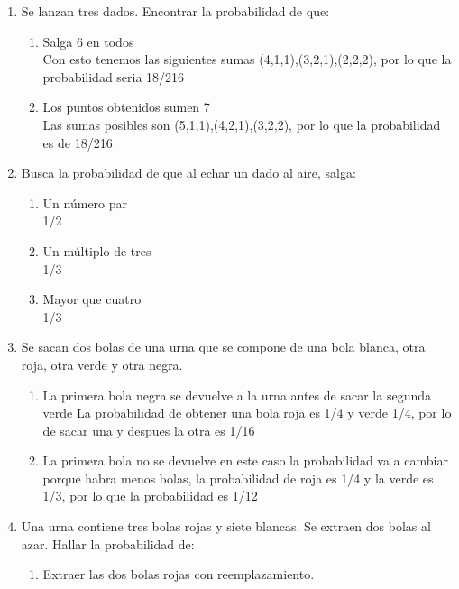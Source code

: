 \documentclass[12pt,letterpaper]{report}
\begin{document}
\begin{enumerate}
\begin{enumerate}
    En este caso nos piden que sea, 3,6,9,12, por lo que los posibles numeros son (2,1),(1,2),(4,2),(2,4),(5,1),(1,5),(3,3),(6,3),(3,6),(5,4),(4,5),(6,6), por lo que la probabilidad es 12/36
    \end{enumerate}
    \item Se lanzan tres dados. Encontrar la probabilidad de que:
    \begin{enumerate}
    \item Salga 6 en todos\\
    Con esto tenemos las siguientes sumas (4,1,1),(3,2,1),(2,2,2), por lo que la probabilidad seria 18/216
    \item Los puntos obtenidos sumen 7\\
    Las sumas posibles son (5,1,1),(4,2,1),(3,2,2), por lo que la probabilidad es de 18/216
    \end{enumerate}
    \item Busca la probabilidad de que al echar un dado al aire, salga:
    \begin{enumerate}
    \item Un número par\\
    1/2
    \item Un múltiplo de tres\\
    1/3
    \item Mayor que cuatro\\
    1/3
    \end{enumerate}
    \item Se sacan dos bolas de una urna que se compone de una bola blanca, otra roja, otra verde y otra negra.
    \begin{enumerate}
    \item La primera bola negra se devuelve a la urna antes de sacar la segunda verde
    La probabilidad de obtener una bola roja es 1/4 y verde 1/4, por lo de sacar una y despues la otra es 1/16
    \item La primera bola no se devuelve
    en este caso la probabilidad va a cambiar porque habra menos bolas, la probabilidad de roja es 1/4 y la verde es 1/3, por lo que la probabilidad es 1/12
    \end{enumerate}
    \item Una urna contiene tres bolas rojas y siete blancas. Se extraen dos bolas al azar. Hallar la probabilidad de:
    \begin{enumerate}
    \item Extraer las dos bolas rojas con reemplazamiento.\\

\end{enumerate}
\end{enumerate}
\end{document}
